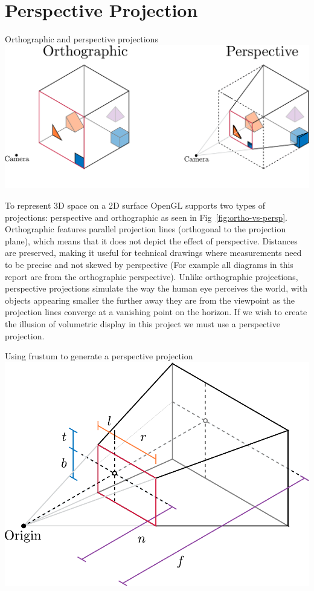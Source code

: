\section{Perspective Projection}

\begin{figureBox}[label={fig:ortho-vs-persp}, width=0.8\linewidth]{Orthographic and perspective projections}
    \includegraphics[width = 0.8\linewidth]{./background/figures/projection/ortho-vs-persp.pdf}
\end{figureBox}

To represent 3D space on a 2D surface OpenGL supports two types of projections: perspective and orthographic as seen in Fig~\ref{fig:ortho-vs-persp}. Orthographic features parallel projection lines (orthogonal to the projection plane), which means that it does not depict the effect of perspective. Distances are preserved, making it useful for technical drawings where measurements need to be precise and not skewed by perspective (For example all diagrams in this report are from the orthographic perspective). Unlike orthographic projections, perspective projections simulate the way the human eye perceives the world, with objects appearing smaller the further away they are from the viewpoint as the projection lines converge at a vanishing point on the horizon. If we wish to create the illusion of volumetric display in this project we must use a perspective projection. \\

\begin{figureBox}[label={fig:persp-projection}, width=0.8\linewidth]{Using frustum to generate a perspective projection}
    \includegraphics[width = 0.8\linewidth]{./background/figures/projection/persp-projection.pdf}
\end{figureBox}

